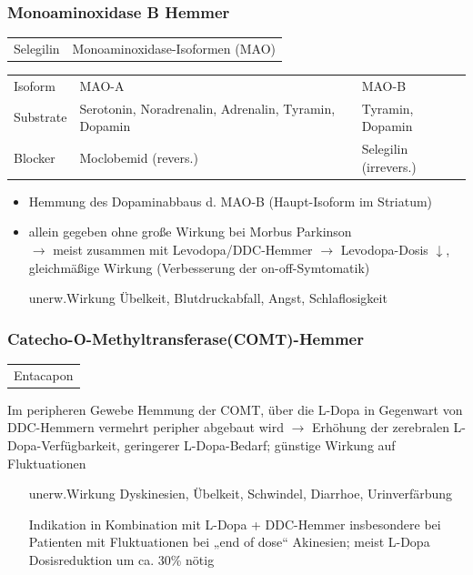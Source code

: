 \documentclass[10pt,a4paper]{report}
\begin{document}
\subsubsection{Monoaminoxidase B Hemmer} %
\label{ssub:monoaminoxidase_b_hemmer}
\begin{tabularx}{\textwidth}{XX}
Selegilin&Monoaminoxidase-Isoformen (MAO)\\
\end{tabularx}
\begin{tabularx}{\textwidth}{lXX}
Isoform&MAO-A&MAO-B\\
Substrate&Serotonin, Noradrenalin, Adrenalin, Tyramin, Dopamin&Tyramin, Dopamin\\
Blocker&Moclobemid (revers.)&Selegilin (irrevers.)\\
\end{tabularx}
\begin{itemize}
	\item Hemmung des Dopaminabbaus d. MAO-B (Haupt-Isoform im Striatum)
	\item allein gegeben ohne große Wirkung bei Morbus Parkinson\\
	$\rightarrow$ meist zusammen mit Levodopa/DDC-Hemmer $\rightarrow$ Levodopa-Dosis $\downarrow$, gleichmäßige Wirkung (Verbesserung der on-off-Symtomatik)
	\item[unerw.Wirkung]Übelkeit, Blutdruckabfall, Angst, Schlaflosigkeit
\end{itemize}
\subsubsection{Catecho-O-Methyltransferase(COMT)-Hemmer} %
\label{ssub:catecho_o_methyltransferase_}
\begin{tabular}{c}
Entacapon
\end{tabular}
Im peripheren Gewebe Hemmung der COMT, über die L-Dopa in Gegenwart von DDC-Hemmern vermehrt peripher abgebaut wird $\rightarrow$ Erhöhung der zerebralen L-Dopa-Verfügbarkeit, geringerer L-Dopa-Bedarf; günstige Wirkung auf Fluktuationen
\begin{itemize}
	\item[unerw.Wirkung] Dyskinesien, Übelkeit, Schwindel, Diarrhoe, Urinverfärbung
	\item[Indikation] in Kombination mit L-Dopa + DDC-Hemmer insbesondere bei Patienten mit Fluktuationen bei „end of dose“ Akinesien; meist L-Dopa Dosisreduktion um ca. 30\% nötig
\end{itemize}
\end{document}
